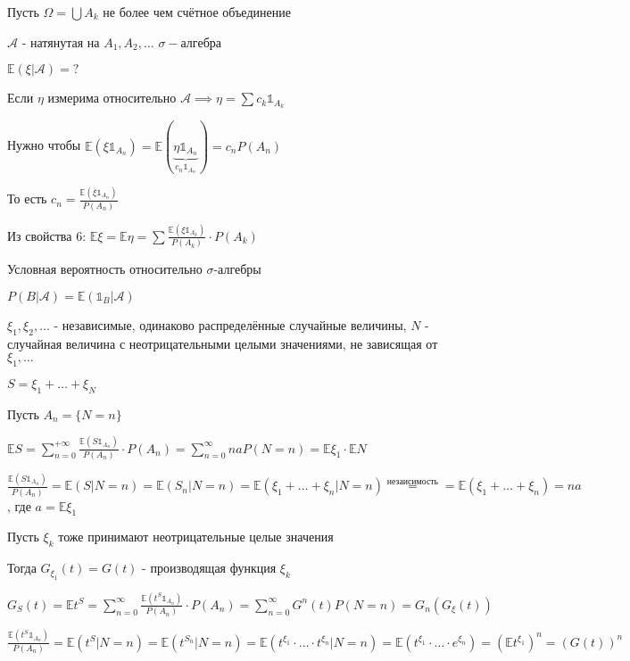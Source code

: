 \begin{example}
    Пусть $\Omega = \bigcup A_k$  не более чем счётное объединение

    $\mathcal{A}$ - натянутая на $A_1, A_2, \ldots$ $\sigma-$алгебра

    $\mathbb{E} (\xi | \mathcal{A}) = ?$

    Если $\eta$ измерима относительно $\mathcal{A} \implies \eta = \sum c_k \mathds{1}_{A_k}$

    Нужно чтобы $\mathbb{E} (\xi \mathds{1}_{A_n}) = \mathbb{E} (\underbrace{\eta \mathds{1}_{A_n}}_{c_n \mathds{1}_{A_n}}) = c_n P(A_n)$

    То есть $c_n = \frac{\mathbb{E} (\xi \mathds{1}_{A_n})}{P(A_n)}$

    \begin{remark}
        Из свойства 6: $\mathbb{E} \xi = \mathbb{E} \eta = \sum \frac{\mathbb{E} (\xi \mathds{1}_{A_k})}{P(A_k)} \cdot P(A_k)$
    \end{remark}
\end{example}

\begin{definition}
    Условная вероятность относительно $\sigma$-алгебры

    $P(B | \mathcal{A}) = \mathbb{E} (\mathds{1}_B | \mathcal{A})$
\end{definition}

\begin{example}
    $\xi_1, \xi_2, \ldots$ - независимые, одинаково распределённые случайные величины, $N$ - случайная величина с неотрицательными целыми значениями, не зависящая от $\xi_1, \ldots$

    $S = \xi_1 + \ldots + \xi_{N}$

    Пусть $A_n = \{ N = n \}$

    $\mathbb{E} S = \sum\limits_{n = 0}^{+\infty} \frac{\mathbb{E} (S \mathds{1}_{A_n})}{P(A_n)} \cdot P(A_n) = \sum\limits_{n = 0}^\infty na P(N = n) = \mathbb{E} \xi_1 \cdot \mathbb{E} N$

    $\frac{\mathbb{E} (S \mathds{1}_{A_n})}{P(A_n)} = \mathbb{E} (S | N = n) = \mathbb{E} (S_n | N = n) = \mathbb{E} (\xi_1 + \ldots + \xi_n | N = n) \overset{\text{незаисимость}}{=} = \mathbb{E} (\xi_1 + \ldots + \xi_n) = na$, где $a = \mathbb{E} \xi_1$
\end{example}

\begin{example}
    Пусть $\xi_k$ тоже принимают неотрицательные целые значения

    Тогда $G_{\xi_1} (t) = G(t)$ - производящая функция $\xi_k$

    $G_S (t) = \mathbb{E} t^S = \sum_{n = 0}^\infty \frac{\mathbb{E} (t^S \mathds{1}_{A_n})}{P(A_n)} \cdot P(A_n) = \sum\limits_{n = 0}^\infty G^n (t) P(N = n) = G_n (G_{\xi} (t))$

    $\frac{\mathbb{E} (t^S \mathds{1}_{A_n})}{P(A_n)} = \mathbb{E} (t^S | N = n) = \mathbb{E} (t^{S_n} | N = n) = \mathbb{E} (t^{\xi_1} \cdot \ldots \cdot t^{\xi_n} | N = n) = \mathbb{E} (t^{\xi_1} \cdot \ldots \cdot e^{\xi_n}) = (\mathbb{E} t^{\xi_1})^n = (G(t))^n$
\end{example}